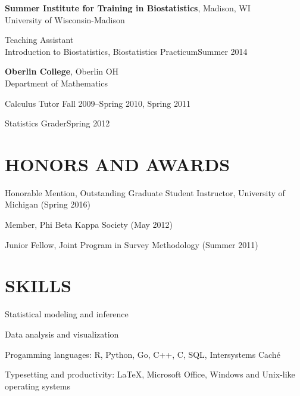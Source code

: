 \documentclass[letterpaper, 11pt]{article}
\begin{document}
\vspace{6pt}
{\bf Summer Institute for Training in Biostatistics}, Madison, WI\\
University of Wisconsin-Madison

\hspace{15pt}Teaching Assistant\\
\hspace{15pt}Introduction to Biostatistics, Biostatistics Practicum\hfill Summer 2014

\vspace{6pt}
{\bf Oberlin College}, Oberlin OH\\
Department of Mathematics

\hspace{15pt}Calculus Tutor \hfill Fall 2009--Spring 2010, Spring 2011

\hspace{15pt}Statistics Grader\hfill Spring 2012

\vspace{18pt}
\section{HONORS AND AWARDS}          
Honorable Mention, Outstanding Graduate Student Instructor, University of Michigan (Spring 2016)

Member, Phi Beta Kappa Society (May 2012)

Junior Fellow, Joint Program in Survey Methodology (Summer 2011)
   
\section{SKILLS}
Statistical modeling and inference

Data analysis and visualization

Progamming languages:  R, Python, Go, C++, C, SQL, Intersystems Cach\'{e}

Typesetting and productivity:  \LaTeX, Microsoft Office, Windows and Unix-like operating systems

\label{sec:lastpage}
\end{document}
